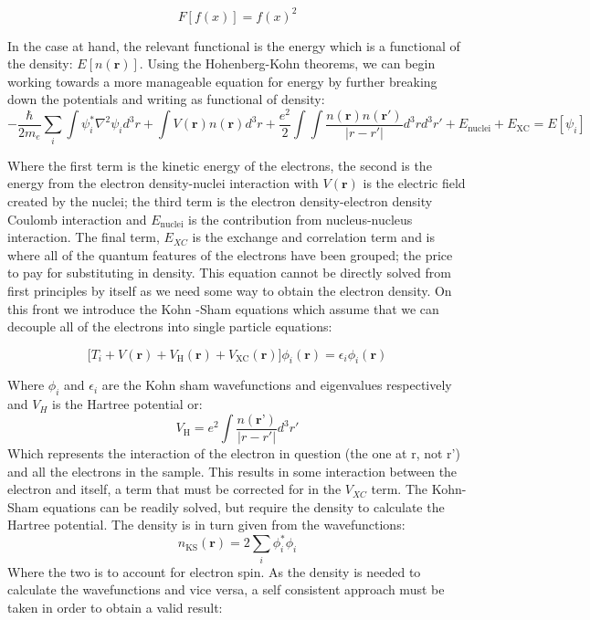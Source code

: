 \begin{equation}
F[f(x)] = f(x)^2 
\end{equation}

 In the case at hand, the relevant functional is the energy which is a functional of the density: $E[n(\textbf{r})]$.  Using the Hohenberg-Kohn theorems, we can begin working towards a more manageable equation for energy by further breaking down the potentials and writing as functional of density: 
\begin{equation}
-\frac{\hbar}{2m_e} \sum_{i} \int \psi_i^* \nabla^2\psi_id^3r + \int V(\textbf{r})n(\textbf{r})d^3r + \frac{e^2}{2} \int \int \frac{n(\textbf{r})n(\textbf{r}')}{|r-r'|}d^3r d^3r' + E_{\mathrm{nuclei}} + E_{\mathrm{XC}} = E[\psi_i]
\end{equation}

Where the first term is the kinetic energy of the electrons, the second is the energy from the electron density-nuclei interaction with $V(\textbf{r})$ is the electric field created by the nuclei; the third term is the electron density-electron density Coulomb interaction and $E_{\mathrm{nuclei}}$ is the contribution from nucleus-nucleus interaction.  The final term, $E_{XC}$ is the exchange and correlation term and is where all of the quantum features of the electrons have been grouped; the price to pay for substituting in density. This equation cannot be directly solved from first principles by itself as we need some way to obtain the electron density.  On this front we introduce the Kohn -Sham equations which assume that we can decouple all of the electrons into single particle equations: 

\begin{equation}
    \bigg[T_i + V(\textbf{r}) + V_{\mathrm{H}}(\textbf{r}) + V_{\mathrm{XC}}(\textbf{r})\bigg] \phi_i(\textbf{r}) = \epsilon_i \phi_i(\textbf{r})
    \label{ks_eq}
\end{equation}

Where $\phi_i$ and $\epsilon_i$ are the Kohn sham wavefunctions and eigenvalues respectively and $V_H$ is the Hartree potential or: 
\begin{equation}
    V_\mathrm{H} = e^2 \int \frac{n(\textbf{r'})}{|r-r'|}d^3r'
\end{equation}
Which represents the interaction of the electron in question (the one at r, not r') and all the electrons in the sample.  This results in some interaction between the electron and itself, a term that must be corrected for in the $V_{XC}$ term.  The Kohn-Sham equations can  be readily solved, but require the density to calculate the Hartree potential.  The density is in turn given from the wavefunctions: 
\begin{equation}
	n_{\mathrm{KS}}(\textbf{r}) = 2 \sum_{i} \phi_i^*\phi_i
	\label{KS_density}
\end{equation}
Where the two is to account for electron spin.  As the density is needed to calculate the wavefunctions and vice versa, a self consistent approach must be taken in order to obtain a valid result:  

